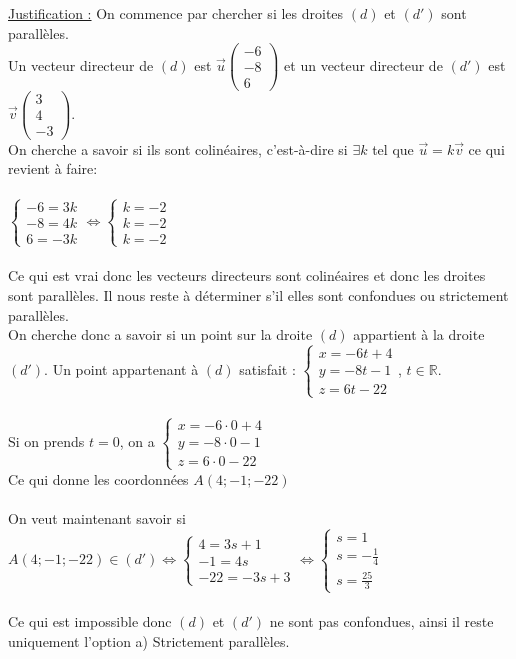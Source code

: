 \documentclass[a4paper, 12pt]{article}
\begin{document}
\noindent
\underline{Justification :}
On commence par chercher si les droites $(d)$ et $(d')$ sont parallèles. 
\\
Un vecteur directeur de $(d)$ est $\vec{u} \begin{pmatrix} -6 \\ -8 \\ 6 \end{pmatrix}$ et un vecteur directeur de $(d')$ est $\vec{v} \begin{pmatrix} 3 \\ 4 \\ -3 \end{pmatrix}$.
\\
On cherche a savoir si ils sont colinéaires, c'est-à-dire si $\exists k$ tel que $ \vec{u} = k\vec{v}$ ce qui revient à faire:
\\ \\
$\begin{cases} -6 = 3k \\ -8 = 4k \\ 6 = -3k \end{cases} \Leftrightarrow \begin{cases} k = -2 \\ k = -2 \\ k = -2 \end{cases}$
\\ \\
Ce qui est vrai donc les vecteurs directeurs sont colinéaires et donc les droites sont parallèles. Il nous reste à déterminer s'il elles sont confondues ou strictement parallèles.
\\
On cherche donc a savoir si un point sur la droite $(d)$ appartient à la droite $(d')$. Un point appartenant à $(d)$ satisfait : 
$ \begin{cases} x = -6t + 4 \\ y = -8t - 1 \\ z = 6t - 22 \end{cases}$, $t \in \mathds{R}$. 
\\ \\
Si on prends $t = 0$, on a $\begin{cases} x = -6 \cdot 0 + 4 \\ y = -8 \cdot 0 - 1 \\ z = 6 \cdot 0 -22 \end{cases}$ \\
Ce qui donne les coordonnées $A(4; -1; -22)$ 
\\ \\
On veut maintenant savoir si $A(4; -1; -22) \in (d') \Leftrightarrow \begin{cases} 4 = 3s + 1 \\ -1 = 4s \\ -22 = -3s + 3 \end{cases} \Leftrightarrow \begin{cases} s = 1 \\ s = -\frac{1}{4} \\ s = \frac{25}{3} \end{cases}$  
\\ \\ 
Ce qui est impossible donc $(d)$ et $(d')$ ne sont pas confondues, ainsi il reste uniquement l'option a) Strictement parallèles.
\end{document}
